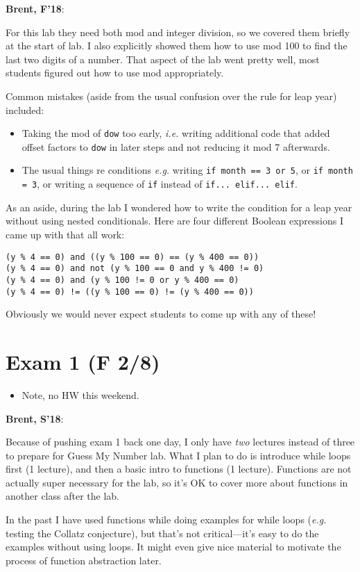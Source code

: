 \documentclass{article}
\newcommand{\eg}{\emph{e.g.}\xspace}
\newenvironment{reflect}[1]
{
  \noindent
  \begin{lrbox}{\reflectbox}
    \begin{minipage}[t]{\textwidth}
      \textbf{#1}:
}{
    \end{minipage}
  \end{lrbox}
  \fbox{\usebox{\reflectbox}}
}
\newcommand{\ready}{\textcolor{Green}{\Checkmark}\xspace}
\begin{document}
\begin{reflect}{Brent, F'18}
  For this lab they need both mod and integer division, so we covered
  them briefly at the start of lab.  I also explicitly showed them how
  to use mod 100 to find the last two digits of a number.  That aspect
  of the lab went pretty well, most students figured out how to use
  mod appropriately.

  Common mistakes (aside from the usual confusion over the rule for
  leap year) included:
  \begin{itemize}
  \item Taking the mod of \verb|dow| too early, \emph{i.e.} writing
    additional code that added offset factors to \verb|dow| in later
    steps and not reducing it mod 7 afterwards.
  \item The usual things re conditions \emph{e.g.} writing \texttt{if month
    == 3 or 5}, or \texttt{if month = 3}, or writing a sequence of
    \verb|if| instead of \texttt{if... elif... elif}.
  \end{itemize}

  As an aside, during the lab I wondered how to write the condition
  for a leap year without using nested conditionals.  Here are four
  different Boolean expressions I came up with that all work:
\begin{verbatim}
(y % 4 == 0) and ((y % 100 == 0) == (y % 400 == 0))
(y % 4 == 0) and not (y % 100 == 0 and y % 400 != 0)
(y % 4 == 0) and (y % 100 != 0 or y % 400 == 0)
(y % 4 == 0) != ((y % 100 == 0) != (y % 400 == 0))
\end{verbatim}
  Obviously we would never expect students to come up with any of these!
\end{reflect}

\newpage
\section{\ready Exam 1 (F 2/8)}

\begin{itemize}
\item Note, no HW this weekend.
\end{itemize}

\begin{reflect}{Brent, S'18}
  Because of pushing exam 1 back one day, I only have \emph{two}
  lectures instead of three to prepare for Guess My Number lab.  What
  I plan to do is introduce while loops first (1 lecture), and then a
  basic intro to functions (1 lecture).  Functions are not actually
  super necessary for the lab, so it's OK to cover more about
  functions in another class after the lab.

  In the past I have used functions while doing examples for while
  loops (\eg testing the Collatz conjecture), but that's not
  critical---it's easy to do the examples without using loops.  It
  might even give nice material to motivate the process of function
  abstraction later.
\end{reflect}
\end{document}
